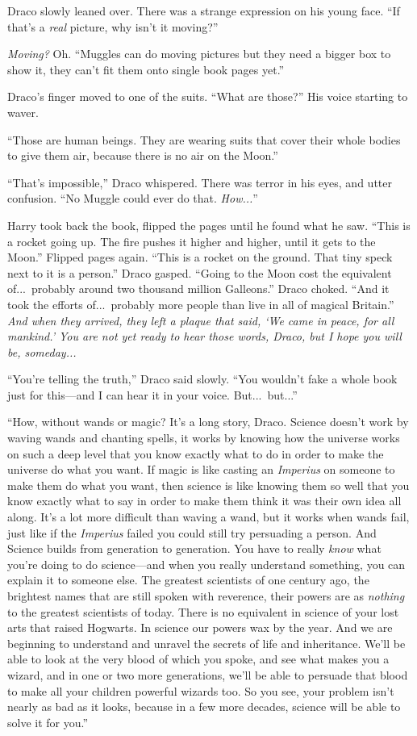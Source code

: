 Draco slowly leaned over. There was a strange expression on his young face. “If that’s a \emph{real} picture, why isn’t it moving?”

\emph{Moving?} Oh. “Muggles can do moving pictures but they need a bigger box to show it, they can’t fit them onto single book pages yet.”

Draco’s finger moved to one of the suits. “What are those?” His voice starting to waver.

“Those are human beings. They are wearing suits that cover their whole bodies to give them air, because there is no air on the Moon.”

“That’s impossible,” Draco whispered. There was terror in his eyes, and utter confusion. “No Muggle could ever do that. \emph{How...}”

Harry took back the book, flipped the pages until he found what he saw. “This is a rocket going up. The fire pushes it higher and higher, until it gets to the Moon.” Flipped pages again. “This is a rocket on the ground. That tiny speck next to it is a person.” Draco gasped. “Going to the Moon cost the equivalent of...\ probably around two thousand million Galleons.” Draco choked. “And it took the efforts of...\ probably more people than live in all of magical Britain.” \emph{And when they arrived, they left a plaque that said, ‘We came in peace, for all mankind.’ You are not yet ready to hear those words, Draco, but I hope you will be, someday...}

“You’re telling the truth,” Draco said slowly. “You wouldn’t fake a whole book just for this—and I can hear it in your voice. But...\ but...”

“How, without wands or magic? It’s a long story, Draco. Science doesn’t work by waving wands and chanting spells, it works by knowing how the universe works on such a deep level that you know exactly what to do in order to make the universe do what you want. If magic is like casting an \emph{Imperius} on someone to make them do what you want, then science is like knowing them so well that you know exactly what to say in order to make them think it was their own idea all along. It’s a lot more difficult than waving a wand, but it works when wands fail, just like if the \emph{Imperius} failed you could still try persuading a person. And Science builds from generation to generation. You have to really \emph{know} what you’re doing to do science—and when you really understand something, you can explain it to someone else. The greatest scientists of one century ago, the brightest names that are still spoken with reverence, their powers are as \emph{nothing} to the greatest scientists of today. There is no equivalent in science of your lost arts that raised Hogwarts. In science our powers wax by the year. And we are beginning to understand and unravel the secrets of life and inheritance. We’ll be able to look at the very blood of which you spoke, and see what makes you a wizard, and in one or two more generations, we’ll be able to persuade that blood to make all your children powerful wizards too. So you see, your problem isn’t nearly as bad as it looks, because in a few more decades, science will be able to solve it for you.”

